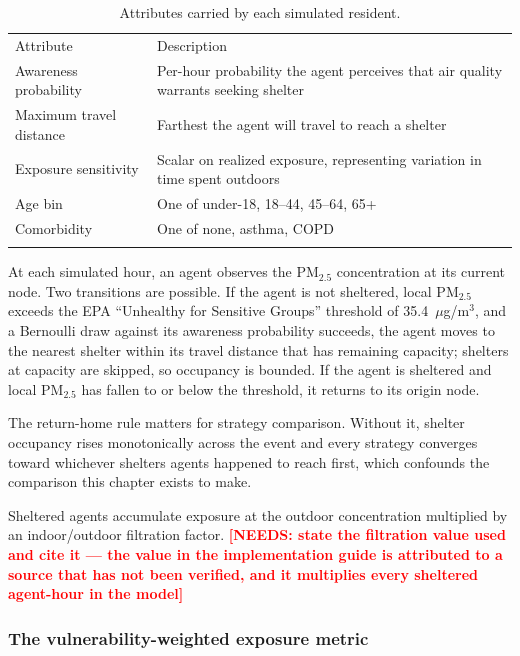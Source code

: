 \documentclass[graybox]{svmult}
\newcommand{\NEEDS}[1]{\textcolor{red}{\textbf{[NEEDS: #1]}}}
\begin{document}
\begin{table}[ht]
\caption{Attributes carried by each simulated resident.}
\label{tab:agent-attrs}
\begin{tabular}{p{3.4cm}p{7.2cm}}
\hline\noalign{\smallskip}
Attribute & Description \\
\noalign{\smallskip}\svhline\noalign{\smallskip}
Awareness probability & Per-hour probability the agent perceives that air quality
warrants seeking shelter \\
Maximum travel distance & Farthest the agent will travel to reach a shelter \\
Exposure sensitivity & Scalar on realized exposure, representing variation in
time spent outdoors \\
Age bin & One of under-18, 18--44, 45--64, 65+ \\
Comorbidity & One of none, asthma, COPD \\
\noalign{\smallskip}\hline\noalign{\smallskip}
\end{tabular}
\end{table}

At each simulated hour, an agent observes the PM$_{2.5}$ concentration at its
current node. Two transitions are possible. If the agent is not sheltered, local
PM$_{2.5}$ exceeds the EPA ``Unhealthy for Sensitive Groups'' threshold of
35.4~$\mu$g/m$^3$, and a Bernoulli draw against its awareness probability
succeeds, the agent moves to the nearest shelter within its travel distance that
has remaining capacity; shelters at capacity are skipped, so occupancy is
bounded. If the agent is sheltered and local PM$_{2.5}$ has fallen to or below
the threshold, it returns to its origin node.

The return-home rule matters for strategy comparison. Without it, shelter
occupancy rises monotonically across the event and every strategy converges
toward whichever shelters agents happened to reach first, which confounds the
comparison this chapter exists to make.

Sheltered agents accumulate exposure at the outdoor concentration multiplied by
an indoor/outdoor filtration factor.
\NEEDS{state the filtration value used and cite it --- the value in the
implementation guide is attributed to a source that has not been verified, and it
multiplies every sheltered agent-hour in the model}

\subsubsection{The vulnerability-weighted exposure metric}
\end{document}
